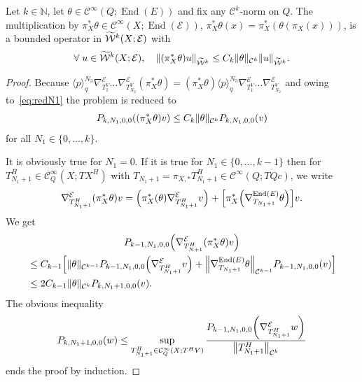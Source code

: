 \documentclass[AHL,Unicode,longabstracts]{cedram}
\newcommand{\N}{\mathbb{N}}
\newcommand{\clW}{\mathcal{W}}
\newcommand{\clC}{\mathcal{C}}
\newcommand{\clE}{\mathcal{E}}
\DeclareMathOperator{\End}{End}
\let\oldtilde\tilde
\renewcommand*{\tilde}[1]{\mathchoice{\widetilde{#1}}{\widetilde{#1}}{\oldtilde{#1}}{\oldtilde{#1}}}
\let\oldforall\forall
\renewcommand*{\forall}{\mathrel{\oldforall}}
\let\originalleft\left
\let\originalright\right
\renewcommand{\left}{\mathopen{}\mathclose\bgroup\originalleft}
\renewcommand{\right}{\aftergroup\egroup\originalright}
\begin{document}
\begin{prop}\label{pr:contTheta}
Let $k\in \N$, let $\theta\in \clC^{\infty}(Q;\End(E))$ and fix any $\clC^{k}$-norm on $Q$. The multiplication by $\pi_{X}^{*}\theta\in \clC^{\infty}(X;\End(\clE))$, $\pi_{X}^{*}\theta(x)=\pi_{X}^{*}(\theta(\pi_{X}(x)))$, is a bounded operator in $\tilde{\clW}^{k}(X;\clE)$ with
\begin{equation}\label{eq:thetaW}
\forall u\in \tilde{\clW}^{k}(X;\clE),\quad
\left\|(\pi_{X}^{*}\theta) u\right\|_{\widetilde{\clW}^{k}}\leq C_{k}\|\theta\|_{\clC^{k}}\|u\|_{\widetilde{\clW}^{k}}.
\end{equation}
\end{prop}
\begin{proof}
Because $\langle p\rangle_{q}^{N_{3}}\nabla_{T_{1}^{V}}^{\clE}\dots \nabla^{\clE}_{T_{N_{2}}^{V}}(\pi_{X}^{*}\theta)= (\pi_{X}^{*}\theta)\langle p\rangle_{q}^{N_{3}}\nabla_{T_{1}^{V}}^{\clE}\dots \nabla^{\clE}_{T_{N_{2}}^{V}}$ and owing to~\eqref{eq:redN1} the problem is reduced to
\[
P_{k,N_{1},0,0}\left(\left(\pi_{X}^{*}\theta\right)v\right)\leq C_{k}\|\theta\|_{\clC^{k}}P_{k,N_{1},0,0}(v)
\]
for all $N_{1}\in \{0,\dots,k\}$.

It is obviously true for $N_{1}=0$. If it is true for $N_{1}\in \{0,\dots, k-1\}$ then for $T_{N_{1}+1}^{H}\in \clC^{\infty}_{Q}(X;TX^{H})$ with $T_{N_{1}+1}=\pi_{X,*}T_{N_{1}+1}^{H}\in \clC^{\infty}(Q;TQc)$, we write
\[
\nabla_{T_{N_{1}+1}^{H}}^{\clE}\left(\pi_{X}^{*}\theta\right)v=\left(\pi_{X}^{*}(\theta)\nabla_{T_{N_{1}+1}^{H}}^{\clE}v\right)+ \left[\pi_{X}^{*}\left(\nabla_{T_{N_{1}+1}}^{\End(E)}\theta\right)\right]v.
\]
We get
\begin{multline*}
P_{k-1,N_{1},0,0}\left(\nabla_{T_{N+1}^{H}}^{\clE}\left(\pi_{X}^{*}\theta\right)v\right)\\
\begin{aligned}
&\leq C_{k-1}\Bigl[\|\theta\|_{\clC^{k-1}}P_{k-1,N_{1},0,0}\left(\nabla_{T_{N_{1}+1}^{H}}^{\clE}v\right)+
\left\|\nabla_{T_{N_{1}+1}}^{\End(E)}\theta\right\|_{\clC^{k-1}} P_{k-1,N_{1},0,0}(v)
\Bigr]\\
&\leq 2C_{k-1}\|\theta\|_{\clC^{k}}P_{k,N_{1}+1,0,0}(v).
\end{aligned}
\end{multline*}
The obvious inequality
\[
P_{k,N_{1}+1,0,0}(w)\leq \sup_{T_{N_{1}+1}^{H}\in \clC^{\infty}_{Q}\left(X;T^{H}V\right)}
\frac{P_{k-1,N_{1},0,0}\left(\nabla_{T_{N_{1}+1}^{H}}^{\clE}w\right)}{\left\|T_{N_{1}+1}^{H}\right\|_{\clC^{k}}}
\]
ends the proof by induction.
\end{proof}
\end{document}
